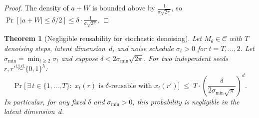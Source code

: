 \documentclass[11pt]{article}
\newtheorem{theorem}{Theorem}[section]
\newcommand{\calC}{\mathcal{C}}
\begin{document}
\begin{proof}
The density of $a + W$ is bounded above by $\frac{1}{\sigma\sqrt{2\pi}}$, so $\Pr[|a + W| \leq \delta/2] \leq \delta \cdot \frac{1}{\sigma\sqrt{2\pi}}$.
\end{proof}

\begin{theorem}[Negligible reusability for stochastic denoising]
\label{thm:cia}
Let $M_\theta \in \calC$ with $T$ denoising steps, latent dimension~$d$, and noise schedule $\sigma_t > 0$ for $t = T, \ldots, 2$. Let $\sigma_{\min} = \min_{t \geq 2} \sigma_t$ and suppose $\delta < 2\sigma_{\min}\sqrt{2\pi}$. For two independent seeds $r, r' \overset{\mathrm{i.i.d.}}{\sim} \{0,1\}^\lambda$:
\[
    \Pr\!\bigl[\,\exists\, t \in \{1, \ldots, T\} :\; x_t(r) \text{ is } \delta\text{-reusable with } x_t(r')\bigr] \;\leq\; T \cdot \left(\frac{\delta}{2\sigma_{\min}\sqrt{\pi}}\right)^{\!d}.
\]
In particular, for any fixed $\delta$ and $\sigma_{\min} > 0$, this probability is negligible in the latent dimension~$d$.
\end{theorem}
\end{document}
